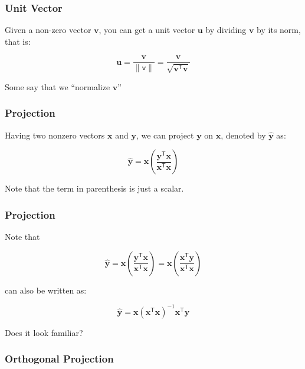 \documentclass[12pt]{beamer}\usepackage[]{graphicx}\usepackage[]{color}
\begin{document}
\begin{frame}
\frametitle{Unit Vector}

Given a non-zero vector $\mathbf{v}$, you can get a unit vector $\mathbf{u}$ by dividing 
$\mathbf{v}$ by its norm, that is:

{\Large
$$
\mathbf{u} = \frac{\mathbf{v}}{\| \mathsf{v} \|} = \frac{\mathbf{v}}{\mathbf{\sqrt{v^{\mathsf{T}} v}}}
$$
}

Some say that we ``normalize $\mathbf{v}$''

\end{frame}


\begin{frame}
\frametitle{Projection}

Having two nonzero 
vectors $\mathbf{x}$ and $\mathbf{y}$, we can project $\mathbf{y}$ on 
$\mathbf{x}$, denoted by $\hat{\mathbf{y}}$ as:

{\Large
$$
\hat{\mathbf{y}} = \mathbf{x} \left( \frac{\mathbf{y^\mathsf{T} x}}{\mathbf{x^\mathsf{T} x}} \right)
$$
}

Note that the term in parenthesis is just a scalar.

\end{frame}


\begin{frame}
\frametitle{Projection}

Note that

{\large
$$
\hat{\mathbf{y}} = \mathbf{x} \left( \frac{\mathbf{y^\mathsf{T} x}}{\mathbf{x^\mathsf{T} x}} \right) = \mathbf{x} \left( \frac{\mathbf{x^\mathsf{T} y}}{\mathbf{x^\mathsf{T} x}} \right)
$$
}

can also be written as:

{\large
$$
\hat{\mathbf{y}} = \mathbf{x} (\mathbf{x^\mathsf{T} x})^{-1} \mathbf{x^\mathsf{T} y} 
$$
}

\begin{center}
{\lit Does it look familiar?}
\end{center}

\end{frame}


\begin{frame}
\frametitle{Orthogonal Projection}
\begin{center}
\end{center}
\end{frame}
\end{document}
